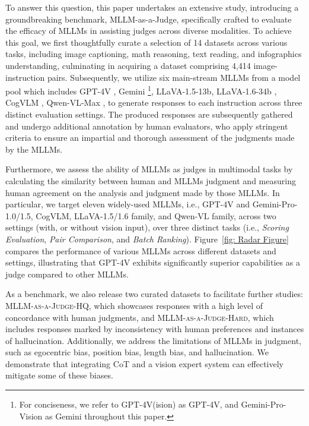 To answer this question, this paper undertakes an extensive study, introducing a groundbreaking benchmark, MLLM-as-a-Judge, specifically crafted to evaluate the efficacy of MLLMs in assisting judges across diverse modalities.
To achieve this goal, we first thoughtfully curate a selection of 14 datasets across various tasks, including image captioning, math reasoning, text reading, and infographics understanding, culminating in acquiring a dataset comprising 4,414 image-instruction pairs.
Subsequently, we utilize six main-stream MLLMs from a model pool which includes GPT-4V \citep{openai2023gpt4v}, Gemini \citep{geminiteam2023gemini}\footnote{For conciseness, we refer to  GPT-4V(ision) as GPT-4V, and Gemini-Pro-Vision as Gemini throughout this paper.}, LLaVA-1.5-13b, LLaVA-1.6-34b \citep{liu2023llava}, CogVLM \citep{wang2023cogvlm}, Qwen-VL-Max \citep{Qwen-VL}, to generate responses to each instruction across three distinct evaluation settings.
The produced responses are subsequently gathered and undergo additional annotation by human evaluators, who apply stringent criteria to ensure an impartial and thorough assessment of the judgments made by the MLLMs.

Furthermore, we assess the ability of MLLMs as judges in multimodal tasks by calculating the similarity between human and MLLMs judgment and measuring human agreement on the analysis and judgment made by those MLLMs.
In particular, we target eleven widely-used MLLMs, i.e., GPT-4V and Gemini-Pro-1.0/1.5, CogVLM, LLaVA-1.5/1.6 family, and Qwen-VL family, across two settings (with, or without vision input), over three distinct tasks (i.e., \textit{Scoring Evaluation}, \textit{Pair Comparison}, and \textit{Batch Ranking}). Figure~\ref{fig: Radar Figure} compares the performance of various MLLMs across different datasets and settings, illustrating that GPT-4V exhibits significantly superior capabilities as a judge compared to other MLLMs.

As a benchmark, we also release two curated datasets to facilitate further studies: \textsc{MLLM-as-a-Judge-HQ}, which showcases responses with a high level of concordance with human judgments, and \textsc{MLLM-as-a-Judge-Hard}, which includes responses marked by inconsistency with human preferences and instances of hallucination. Additionally, we address the limitations of MLLMs in judgment, such as egocentric bias, position bias, length bias, and hallucination. We demonstrate that integrating CoT \citep{wei2022chain} and a vision expert system can effectively mitigate some of these biases.


